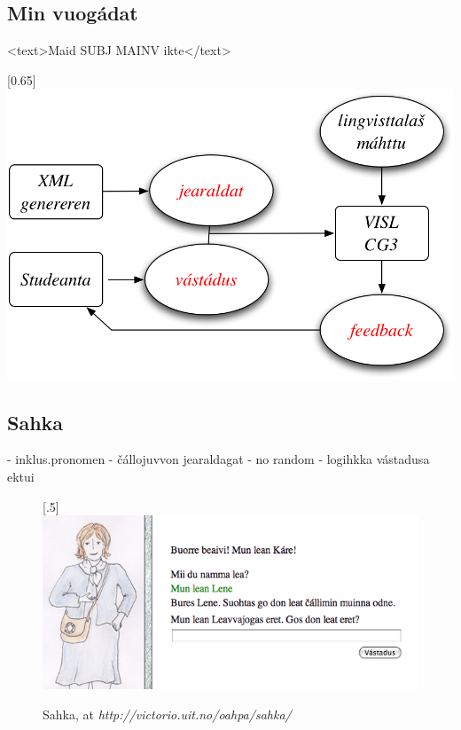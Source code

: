 \documentclass[a4paper,14pt]{article}
\begin{document}
\subsection{Min vuogádat} 
      <text>Maid SUBJ MAINV ikte</text>


\scalebox{0.65}[0.65]{\includegraphics{presentation/img/skovi.png}} 







\subsection{Sahka}
- inklus.pronomen
- čállojuvvon jearaldagat
- no random
- logihkka vástadusa ektui

\begin{figure}[htbp]
\begin{center}
\scalebox{.5}[.5]{\includegraphics{presentation/img/sahka2.png}}\\
\caption{Sahka, at \textit{http://victorio.uit.no/oahpa/sahka/}}
\label{sahka}
\end{center}
\end{figure}
\end{document}
